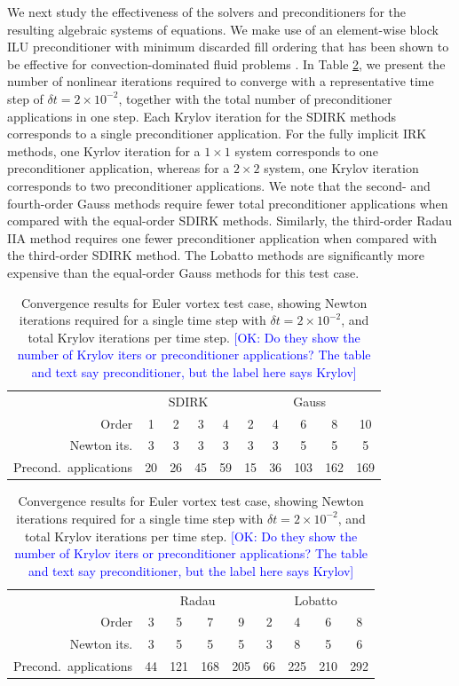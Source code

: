 \documentclass[review]{siamart}
\newcommand{\OK}[1]{\textcolor{blue}{[OK: #1]}}
\begin{document}
We next study the effectiveness of the solvers and preconditioners for the resulting algebraic systems of equations.
We make use of an element-wise block ILU preconditioner with minimum discarded fill ordering that has been shown to be effective for convection-dominated fluid problems \cite{Persson2008}.
In Table \ref{tab:ev-solvers}, we present the number of nonlinear iterations required to converge with a representative time step of $\delta t = 2 \times 10^{-2}$, together with the total number of preconditioner applications in one step.
Each Krylov iteration for the SDIRK methods corresponds to a single preconditioner application.
For the fully implicit IRK methods, one Kyrlov iteration for a $1\times1$ system corresponds to one preconditioner application, whereas for a $2\times2$ system, one Krylov iteration corresponds to two preconditioner applications.
We note that the second- and fourth-order Gauss methods require fewer total preconditioner applications when compared with the equal-order SDIRK methods.
Similarly, the third-order Radau IIA method requires one fewer preconditioner application when compared with the third-order SDIRK method.
The Lobatto methods are significantly more expensive than the equal-order Gauss methods for this test case.

\begin{table}
	\centering
	\caption{Convergence results for Euler vortex test case, showing Newton iterations required for a single time step with $\delta t = 2\times10^{-2}$, and total Krylov iterations per time step. 
%
\OK{Do they show the number of Krylov iters or preconditioner applications? The table and text say preconditioner, but the label here says Krylov}
%	
	}
	\label{tab:ev-solvers}
	\begin{tabular}{r|cccc|ccccc}
		\toprule
		& \multicolumn{4}{c|}{SDIRK} & \multicolumn{5}{c}{Gauss} \\
		Order  & 1 & 2 & 3 & 4 & 2 & 4 & 6 & 8 & 10\\
		\midrule
		Newton its. & 3 & 3 & 3 & 3 & 3 & 3 & 5 & 5 & 5\\
		\midrule
		Precond.\ applications & 20 & 26 & 45 & 59 & 15 & 36 & 103 & 162 & 169\\
		\bottomrule
	\end{tabular}

	\vspace{\floatsep}

	\begin{tabular}{r|cccc|cccc}
		\toprule
		& \multicolumn{4}{c|}{Radau} & \multicolumn{4}{c}{Lobatto} \\
		Order  & 3 & 5 & 7 & 9 & 2 & 4 & 6 & 8\\
		\midrule
		Newton its. & 3 & 5 & 5 & 5 & 3 & 8 & 5 & 6\\
		\midrule
		Precond.\ applications & 44 & 121 & 168 & 205 & 66 & 225 & 210 & 292\\
		\bottomrule
	\end{tabular}
\end{table}
\end{document}
